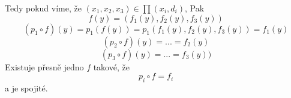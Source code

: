 \documentclass[../main.tex]{subfiles}
\begin{document}
Tedy pokud víme, že $(x_1,x_2,x_3)\in \prod (x_i,d_i)$, Pak
\[f(y) = (f_1(y),f_2(y),f_3(y))\]
\[(p_1\circ f)(y) = p_1(f(y)) = p_1(f_1(y),f_2(y),f_3(y))=f_1(y)\]
\[(p_2\circ f)(y) = ... = f_2(y)\]
\[(p_3\circ f)(y) = ... = f_3(y))\]
Existuje přesně jedno $f$ takové, že 
\[p_i \circ f = f_i\]
a je spojité.
\end{document}
